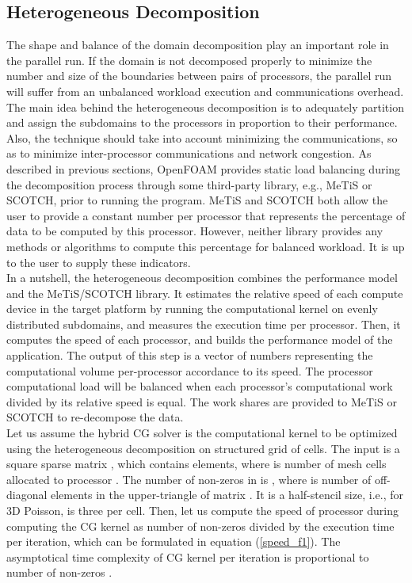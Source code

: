 \documentclass[3p,times]{elsarticle}
\begin{document}
\subsection{Heterogeneous Decomposition}

The shape and balance of the domain decomposition play an important role in the parallel run. If the domain is not decomposed properly to minimize the number and size of the boundaries between pairs of processors, the parallel run will suffer from an unbalanced workload execution and communications overhead.  The main idea behind the heterogeneous decomposition is to adequately partition and assign the subdomains to the processors in proportion to their performance. Also, the technique should take into account minimizing the communications, so as to minimize inter-processor communications and network congestion. As described in previous sections, OpenFOAM provides static load balancing during the decomposition process through some third-party library, e.g., MeTiS or SCOTCH, prior to running the program. MeTiS and SCOTCH both allow the user to provide a constant number per processor that represents the percentage of data to be computed by this processor. However, neither library provides any methods or algorithms to compute this percentage for balanced workload. It is up to the user to supply these indicators.  \\

In a nutshell, the heterogeneous decomposition combines the performance model \cite{fupermode, fpm_14} and the MeTiS/SCOTCH library. It estimates the relative speed of each compute device in the target platform by running the computational kernel on evenly distributed subdomains, and measures the execution time per processor. Then, it computes the speed of each processor, and builds the performance model of the application. The output of this step is a vector of numbers representing the computational volume per-processor accordance to its speed. The processor computational load will be balanced when each processor's computational work divided by its relative speed is equal. The work shares are provided to MeTiS or SCOTCH to re-decompose the data. \\

Let us assume the hybrid CG solver is the computational kernel to be optimized using the heterogeneous decomposition on structured grid of \emph{} cells. The input is a square sparse matrix \emph{}, which contains \emph{} elements, where \emph{} is number of mesh cells allocated to processor \emph{}. The number of non-zeros in \emph{} is \emph{}, where \emph{} is number of off-diagonal elements in the upper-triangle of matrix  \emph{}.  It is a half-stencil size, i.e., for 3D Poisson, \emph{} is three per cell. Then, let us compute the speed \emph{} of processor \emph{} during computing the CG kernel as number of non-zeros \emph{} divided by the execution time \emph{} per iteration, which can be formulated in equation (\ref{speed_f1}). The asymptotical time complexity of CG kernel per iteration is proportional to number of non-zeros \cite{saad_book}. 
\end{document}
